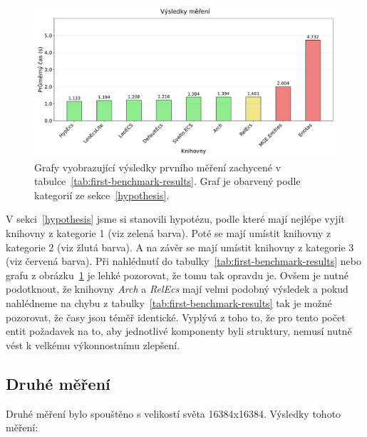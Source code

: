 \begin{figure}[!htb]
    \centering
    \includegraphics[width=1.0\linewidth]{plots/first_benchmark_results.pdf}
    \caption{Grafy vyobrazující výsledky prvního měření zachycené v tabulce~\ref{tab:first-benchmark-results}. Graf je obarvený podle kategorií ze sekce~\ref{hypothesis}.}
    \label{fig:first-benchmark-results}
\end{figure}

V sekci~\ref{hypothesis} jsme si stanovili hypotézu, podle které mají nejlépe vyjít knihovny z kategorie 1 (viz zelená barva). Poté se mají umístit knihovny z kategorie 2 (viz žlutá barva). A na závěr se mají umístit knihovny z kategorie 3 (viz červená barva). Při nahlédnutí do tabulky~\ref{tab:first-benchmark-results} nebo grafu z obrázku~\ref{fig:first-benchmark-results} je lehké pozorovat, že tomu tak opravdu je. Ovšem je nutné podotknout, že knihovny \textit{Arch} a \textit{RelEcs} mají velmi podobný výsledek a pokud nahlédneme na chybu z tabulky~\ref{tab:first-benchmark-results} tak je možné pozorovat, že časy jsou téměř identické. Vyplývá z toho to, že pro tento počet entit požadavek na to, aby jednotlivé komponenty byli struktury, nemusí nutně vést k velkému výkonnostnímu zlepšení.

\newpage

\subsection{Druhé měření}
Druhé měření bylo spouštěno s velikostí světa 16384x16384. Výsledky tohoto měření:

